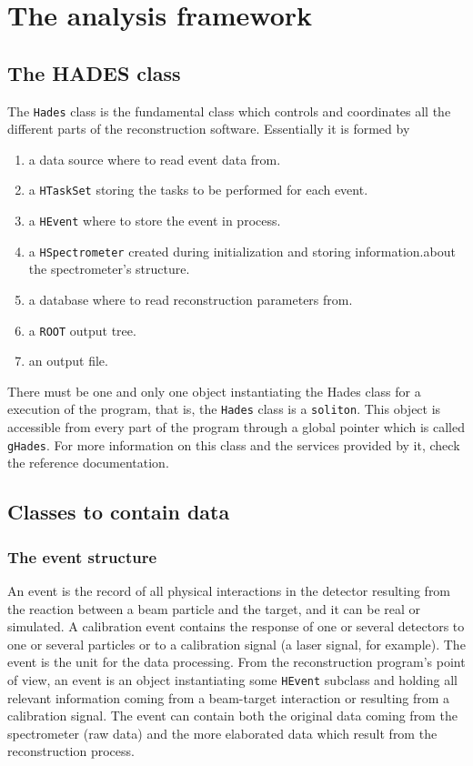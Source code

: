 \chapter{The analysis framework}


\section{The HADES class}

The \verb+Hades+ class is the fundamental class which controls and 
coordinates all the different parts of the reconstruction 
software. Essentially it is formed by %

\begin{enumerate}
    \item a data source where to read event data from.
    \item a \verb+HTaskSet+ storing the tasks to be performed for each event.
    \item a \verb+HEvent+ where to store the event in process.
    \item a \verb+HSpectrometer+ created during initialization and 
          storing information.about the spectrometer's structure.
    \item a database where to read reconstruction parameters from.
    \item a \verb+ROOT+ output tree.
    \item an output file. 
\end{enumerate}

There must be one and only one object instantiating the Hades 
class for a execution of the program, that is, the \verb+Hades+ class 
is a \verb+soliton+. This object is accessible from every part of 
the program through a global pointer which is called \verb+gHades+. 
For more information on this class and the services provided by 
it, check the reference documentation.

\section{Classes to contain data}

\subsection{The event structure}

An event is the record of all physical interactions in the detector 
resulting from the reaction between a beam particle and the target, 
and it can be real or simulated. A calibration event contains the 
response of one or several detectors to one or several particles or 
to a calibration signal (a laser signal, for example). The event is 
the unit for the data processing. From the reconstruction program's 
point of view, an event is an object instantiating some \verb+HEvent+ 
subclass and holding all relevant information coming from a 
beam-target interaction or resulting from a calibration signal. The 
event can contain both the original data coming from the spectrometer 
(raw data) and the more elaborated data which result from the 
reconstruction process.

